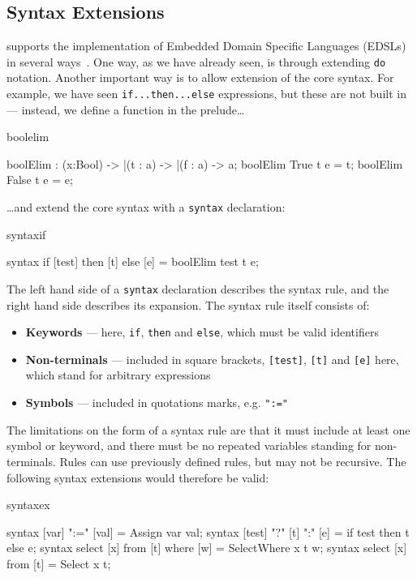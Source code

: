 \subsection{Syntax Extensions}

\Idris{} supports the implementation of Embedded Domain Specific Languages (EDSLs) in
several ways~\cite{res-dsl-padl12}. One way, as we have already seen, is through
extending \texttt{do} notation. Another important way is to allow extension of the core
syntax. For example, we have seen \texttt{if...then...else} expressions, but these
are not built in --- instead, we define a function in the prelude\ldots

\begin{SaveVerbatim}{boolelim}

boolElim : (x:Bool) -> |(t : a) -> |(f : a) -> a; 
boolElim True  t e = t;
boolElim False t e = e;

\end{SaveVerbatim}

\noindent
\ldots and extend the core syntax with a \texttt{syntax} declaration:

\begin{SaveVerbatim}{syntaxif}

syntax if [test] then [t] else [e] = boolElim test t e;

\end{SaveVerbatim}

\noindent
The left hand side of a \texttt{syntax} declaration describes the syntax rule, and the right
hand side describes its expansion. The syntax rule itself consists of:

\begin{itemize}
\item \textbf{Keywords} --- here, \texttt{if}, \texttt{then} and \texttt{else}, which must
be valid identifiers
\item \textbf{Non-terminals} --- included in square brackets, \texttt{[test]}, \texttt{[t]}
and \texttt{[e]} here, which stand for arbitrary expressions
\item \textbf{Symbols} --- included in quotations marks, e.g. \texttt{":="}
\end{itemize}

\noindent
The limitations on the form of a syntax rule are that it must include at least one
symbol or keyword, and there must be no repeated variables standing for non-terminals.
Rules can use previously defined rules, but may not be recursive.
The following syntax extensions would therefore be valid:

\begin{SaveVerbatim}{syntaxex}

syntax [var] ":=" [val]              = Assign var val;
syntax [test] "?" [t] ":" [e]        = if test then t else e;
syntax select [x] from [t] where [w] = SelectWhere x t w;
syntax select [x] from [t]           = Select x t;

\end{SaveVerbatim}


